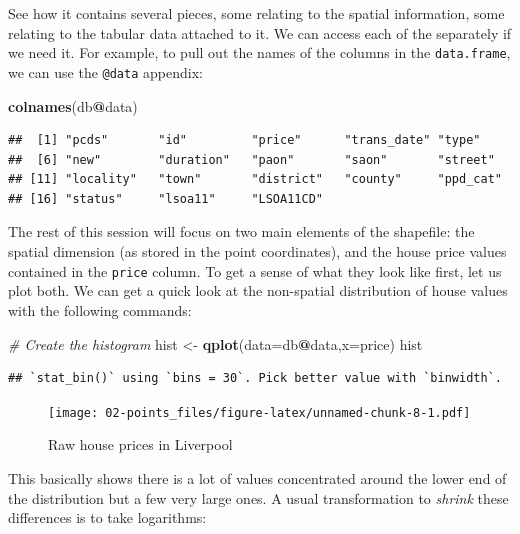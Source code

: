 \documentclass[]{book}
\newenvironment{Shaded}{\begin{snugshade}}{\end{snugshade}}
\newcommand{\KeywordTok}[1]{\textcolor[rgb]{0.13,0.29,0.53}{\textbf{#1}}}
\newcommand{\DataTypeTok}[1]{\textcolor[rgb]{0.13,0.29,0.53}{#1}}
\newcommand{\StringTok}[1]{\textcolor[rgb]{0.31,0.60,0.02}{#1}}
\newcommand{\CommentTok}[1]{\textcolor[rgb]{0.56,0.35,0.01}{\textit{#1}}}
\newcommand{\OperatorTok}[1]{\textcolor[rgb]{0.81,0.36,0.00}{\textbf{#1}}}
\newcommand{\NormalTok}[1]{#1}
\begin{document}
See how it contains several pieces, some relating to the spatial
information, some relating to the tabular data attached to it. We can
access each of the separately if we need it. For example, to pull out
the names of the columns in the \texttt{data.frame}, we can use the
\texttt{@data} appendix:

\begin{Shaded}
\begin{Highlighting}[]
\KeywordTok{colnames}\NormalTok{(db}\OperatorTok{@}\NormalTok{data)}
\end{Highlighting}
\end{Shaded}

\begin{verbatim}
##  [1] "pcds"       "id"         "price"      "trans_date" "type"      
##  [6] "new"        "duration"   "paon"       "saon"       "street"    
## [11] "locality"   "town"       "district"   "county"     "ppd_cat"   
## [16] "status"     "lsoa11"     "LSOA11CD"
\end{verbatim}

The rest of this session will focus on two main elements of the
shapefile: the spatial dimension (as stored in the point coordinates),
and the house price values contained in the \texttt{price} column. To
get a sense of what they look like first, let us plot both. We can get a
quick look at the non-spatial distribution of house values with the
following commands:

\begin{Shaded}
\begin{Highlighting}[]
\CommentTok{# Create the histogram}
\NormalTok{hist <-}\StringTok{ }\KeywordTok{qplot}\NormalTok{(}\DataTypeTok{data=}\NormalTok{db}\OperatorTok{@}\NormalTok{data,}\DataTypeTok{x=}\NormalTok{price)}
\NormalTok{hist}
\end{Highlighting}
\end{Shaded}

\begin{verbatim}
## `stat_bin()` using `bins = 30`. Pick better value with `binwidth`.
\end{verbatim}

\begin{figure}
\centering
\texttt{[image: 02-points\_files/figure-latex/unnamed-chunk-8-1.pdf]}
\caption{\label{fig:unnamed-chunk-8}Raw house prices in Liverpool}
\end{figure}

This basically shows there is a lot of values concentrated around the
lower end of the distribution but a few very large ones. A usual
transformation to \emph{shrink} these differences is to take logarithms:
\end{document}
